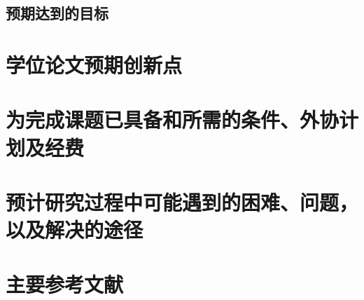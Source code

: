 \subsection{预期达到的目标}
\section{学位论文预期创新点}
\section{为完成课题已具备和所需的条件、外协计划及经费}
\section{预计研究过程中可能遇到的困难、问题，以及解决的途径}
\section{主要参考文献}



